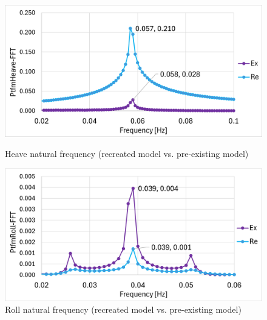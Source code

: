 \documentclass[a4paper, 11pt]{article}
\begin{document}
\begin{figure}[H]
    \begin{minipage}{0.47\textwidth}
        \centering
        \includegraphics[width=1\textwidth]{nat_freq_heave_1.png}
        \caption{\small Heave natural frequency (recreated model vs. pre-existing model)}
        \label{fig:nat_freq_heave_recreated}
    \end{minipage}
    \hfill
    \begin{minipage}{0.48\textwidth}
        \centering
        \includegraphics[width=1\textwidth]{nat_freq_roll_1.png}
        \caption{\small Roll natural frequency (recreated model vs. pre-existing model)}
        \label{fig:nat_freq_roll_recreated}
    \end{minipage}
\end{figure}
\end{document}
